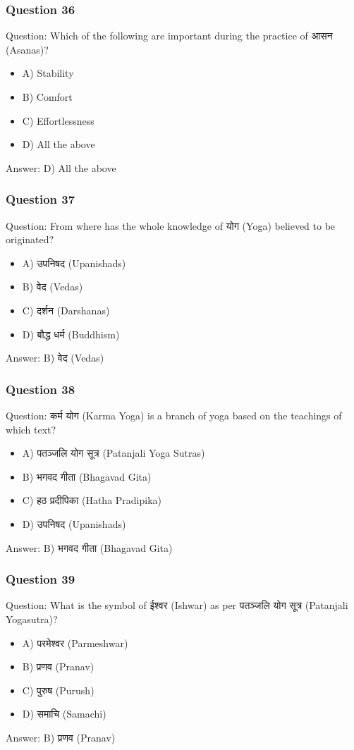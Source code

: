 \begin{frame}[fragile]\frametitle{Question 36}
Question: Which of the following are important during the practice of आसन (Asanas)?
\begin{itemize}
\item A) Stability
\item B) Comfort
\item C) Effortlessness
\item D) All the above
\end{itemize}
Answer: D) All the above
\end{frame}

\begin{frame}[fragile]\frametitle{Question 37}
Question: From where has the whole knowledge of योग (Yoga) believed to be originated?
\begin{itemize}
\item A) उपनिषद (Upanishads)
\item B) वेद (Vedas)
\item C) दर्शन (Darshanas)
\item D) बौद्ध धर्म (Buddhism)
\end{itemize}
Answer: B) वेद (Vedas)
\end{frame}

\begin{frame}[fragile]\frametitle{Question 38}
Question: कर्म योग (Karma Yoga) is a branch of yoga based on the teachings of which text?
\begin{itemize}
\item A) पतञ्जलि योग सूत्र (Patanjali Yoga Sutras)
\item B) भगवद गीता (Bhagavad Gita)
\item C) हठ प्रदीपिका (Hatha Pradipika)
\item D) उपनिषद (Upanishads)
\end{itemize}
Answer: B) भगवद गीता (Bhagavad Gita)
\end{frame}

\begin{frame}[fragile]\frametitle{Question 39}
Question: What is the symbol of ईश्वर (Ishwar) as per पतञ्जलि योग सूत्र (Patanjali Yogasutra)?
\begin{itemize}
\item A) परमेश्वर (Parmeshwar)
\item B) प्रणव (Pranav)
\item C) पुरुष (Purush)
\item D) समाचि (Samachi)
\end{itemize}
Answer: B) प्रणव (Pranav)
\end{frame}

